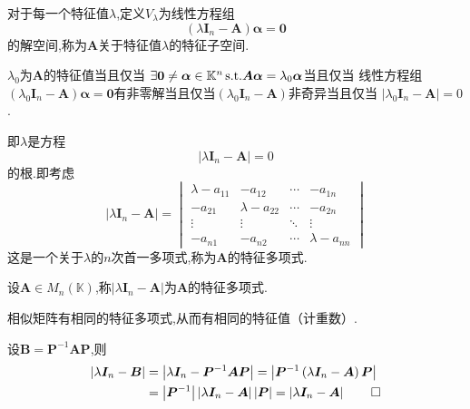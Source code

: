 \begin{formal}
\begin{definition}[矩阵意义的特征子空间]\label{def:矩阵意义的特征子空间}
    对于每一个特征值$\lambda$,定义$V_{\lambda}$为线性方程组
    \[
    \left(
        \lambda\bm{I}_n-\bm{A}
    \right)\bm{\alpha}=\bm{0}
    \]
    的解空间,称为$\bm{A}$关于特征值$\lambda$的特征子空间.
\end{definition}
\end{formal}
\begin{red}
\begin{remark}
    $\lambda_0$为$\bm{A}$的特征值当且仅当
    $\exists \bm{0}\neq \bm{\alpha}\in\mathbb{K}^n \,\textup{s.t.}\bm{A\alpha}=\lambda_0\bm{\alpha}$当且仅当
    线性方程组$\left(
        \lambda_0\bm{I}_n-\bm{A}
    \right)\bm{\alpha}=\bm{0}$有非零解当且仅当$\left(
        \lambda_0\bm{I}_n-\bm{A}
    \right)$非奇异当且仅当
    $\left|\lambda_0\bm{I}_n-\bm{A}\right|=0$.

    即$\lambda$是方程
    \[\left|\lambda\bm{I}_n-\bm{A}\right|=0\]的根.即考虑
    \[
    \left|
         \lambda\bm{I}_ n-\bm{A}
    \right|=\begin{vmatrix}
        \lambda-a_{11}&-a_{12}&\cdots&-a_{1n}\\
        -a_{21}&\lambda-a_{22}&\cdots&-a_{2n}\\
        \vdots&\vdots&\ddots&\vdots\\
        -a_{n1}&-a_{n2}&\cdots&\lambda-a_{nn}
    \end{vmatrix}
    \]
    这是一个关于$\lambda$的$n$次首一多项式,称为$\bm{A}$的特征多项式.
\end{remark}
\end{red}
\begin{formal}
\begin{definition}[矩阵的特征多项式]\label{def:矩阵的特征多项式}
    设$\bm{A}\in M_n\left(\mathbb{K}\right)$,称$\left|
        \lambda\bm{I}_n-\bm{A}
    \right|$为$\bm{A}$的特征多项式.
\end{definition}
\end{formal}
\begin{green}
\begin{lemma}[相似矩阵的特征根]\label{lem:相似矩阵的特征根}
    相似矩阵有相同的特征多项式,从而有相同的特征值（计重数）.
\end{lemma}
\begin{Proof}
设$\bm{B}=\bm{P}^{-1}\bm{AP}$,则
\begin{align*}
    \left|
       \lambda\bm{I}_n-\bm{B}   
\right|&=
\left|
    \lambda\bm{I}_n-\bm{P}^{-1}\bm{AP}
\right|=\left|
    \bm{P}^{-1}\left(
        \lambda\bm{I}_n-\bm{A}
    \right)\bm{P}
\right|\\
&=\left|
    \bm{P}^{-1}
\right|\left|
    \lambda\bm{I}_n-\bm{A}
\right|\left|
    \bm{P}
\right|=\left|
    \lambda\bm{I}_n-\bm{A}
\right|\qedhere
\end{align*}
\end{Proof}
\end{green}
